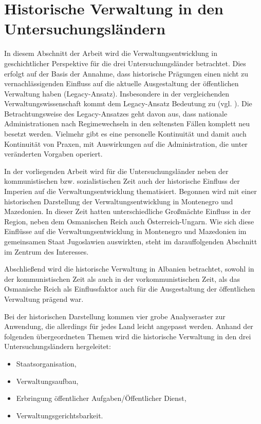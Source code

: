 \section{ Historische Verwaltung in den Untersuchungsländern }
In diesem Abschnitt der Arbeit wird die Verwaltungsentwicklung in geschichtlicher Perspektive für die drei Untersuchungsländer betrachtet. Dies erfolgt auf der Basis der Annahme, dass historische Prägungen einen nicht zu vernachlässigenden Einfluss auf die aktuelle Ausgestaltung der öffentlichen Verwaltung haben (Legacy-Ansatz). Insbesondere in der vergleichenden Verwaltungswissenschaft kommt dem Legacy-Ansatz Bedeutung zu (vgl. \cite{kuhlm, kuhwol}). Die Betrachtungsweise des Legacy-Ansatzes geht davon aus, dass nationale Administrationen nach Regimewechseln in den seltensten Fällen komplett neu besetzt werden. Vielmehr gibt es eine personelle Kontinuität und damit auch Kontinuität von Praxen, mit Auswirkungen auf die Administration, die unter veränderten Vorgaben operiert.\par
In der vorliegenden Arbeit wird für die Untersuchungsländer neben der kommunistischen bzw. sozialistischen Zeit auch der historische Einfluss der Imperien auf die Verwaltungsentwicklung thematisiert. Begonnen wird mit einer historischen Darstellung der Verwaltungsentwicklung in Montenegro und Mazedonien. In dieser Zeit hatten unterschiedliche Großmächte Einfluss in der Region, neben dem Osmanischen Reich auch Österreich-Ungarn. Wie sich diese Einflüsse auf die Verwaltungsentwicklung in Montenegro und Mazedonien im gemeinsamen Staat Jugoslawien auswirkten, steht im darauffolgenden Abschnitt im Zentrum des Interesses.\par
Abschließend wird die historische Verwaltung in Albanien betrachtet, sowohl in der kommunistischen Zeit als auch in der vorkommunistischen Zeit, als das Osmanische Reich als Einflussfaktor auch für die Ausgestaltung der öffentlichen Verwaltung prägend war.\par
Bei der historischen Darstellung kommen vier grobe Analyseraster zur Anwendung, die allerdings für jedes Land leicht angepasst werden. Anhand der folgenden übergeordneten Themen wird die historische Verwaltung in den drei Untersuchungsländern hergeleitet:
\begin{itemize} \itemsep1pt \parskip0pt 
\item Staatsorganisation,
\item Verwaltungsaufbau,
\item Erbringung öffentlicher Aufgaben/Öffentlicher Dienst,
\item Verwaltungsgerichtsbarkeit.
\end{itemize}
